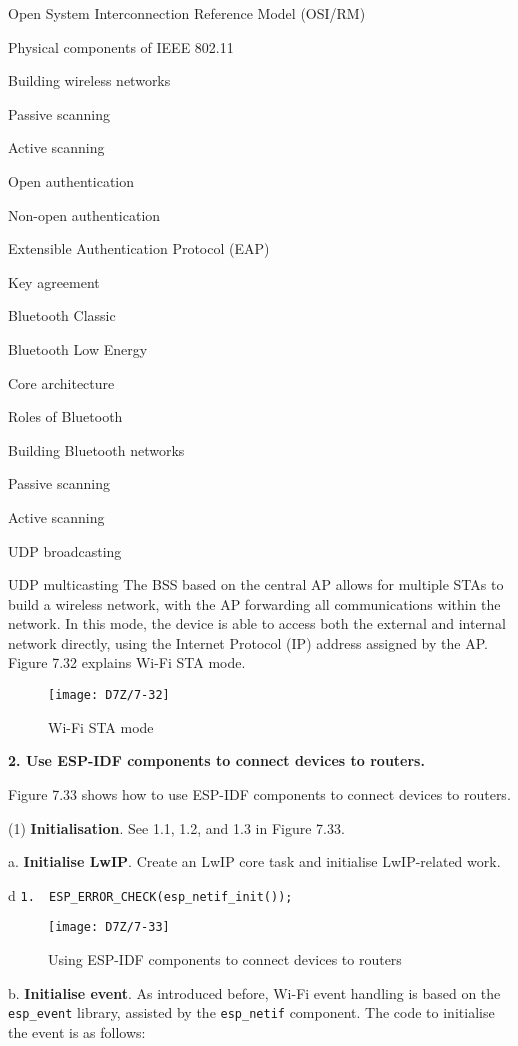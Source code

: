 \documentclass[a4paper,12pt]{book}
\begin{document}
\begin{term}{Open System Interconnection Reference Model (OSI/RM)}
\begin{term}{Physical components of IEEE 802.11}
\begin{term}{Building wireless networks}
\begin{term}{Passive scanning}
\begin{term}{Active scanning}
\begin{term}{Open authentication}
\begin{term}{Non-open authentication}
\begin{term}{Extensible Authentication Protocol (EAP)}
\begin{term}{Key agreement}
\begin{term}{Bluetooth Classic}
\begin{term}{Bluetooth Low Energy}
\begin{term}{Core architecture}
\begin{term}{Roles of Bluetooth}
\begin{term}{Building Bluetooth networks}
\begin{term}{Passive scanning}
\begin{term}{Active scanning}
\begin{term}{UDP broadcasting}
\begin{term}{UDP multicasting}
The BSS based on the central AP allows for multiple STAs to build a wireless network, with the AP forwarding all communications within the network. In this mode, the device is able to access both the external and internal network directly, using the Internet Protocol (IP) address assigned by the AP. Figure 7.32 explains Wi-Fi STA mode.

\begin{figure}[!h]
    \centering
    \texttt{[image: D7Z/7-32]}
    \caption{Wi-Fi STA mode}
\end{figure}

\textbf{2. Use ESP-IDF components to connect devices to routers.}

Figure 7.33 shows how to use ESP-IDF components to connect devices to routers.

(1) \textbf{Initialisation}. See 1.1, 1.2, and 1.3 in Figure 7.33.

a. \textbf{Initialise LwIP}. Create an LwIP core task and initialise LwIP-related work.
        

\begin{tabular}{d}
\verb|1.  ESP_ERROR_CHECK(esp_netif_init());|
\end{tabular}


\newpage
{} %
\begin{figure}[!h]
    \centering
    \texttt{[image: D7Z/7-33]}
    \caption{Using ESP-IDF components to connect devices to routers}
\end{figure}

\restoregeometry %
        
b. \textbf{Initialise event}. As introduced before, Wi-Fi event handling is based on the \verb|esp_event| library, assisted by the \verb|esp_netif| component. The code to initialise the event is as follows:



\end{term}
\end{term}
\end{term}
\end{term}
\end{term}
\end{term}
\end{term}
\end{term}
\end{term}
\end{term}
\end{term}
\end{term}
\end{term}
\end{term}
\end{term}
\end{term}
\end{term}
\end{term}
\end{document}
